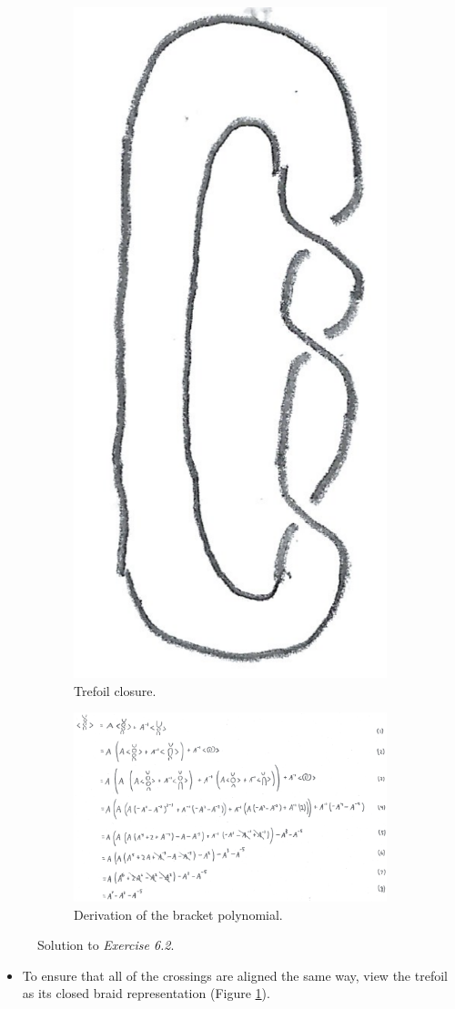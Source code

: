 \documentclass[titlepage]{article}
\numberwithin{figure}{section}
\numberwithin{table}{section}
\numberwithin{equation}{section}
\begin{document}
\begin{itemize}
    \begin{figure}[h!]
        \centering
        \begin{subfigure}[b]{0.3\linewidth}
            \centering
            \includegraphics[width=0.3\linewidth]{Blender/ex6-2a.png}
            \caption{Trefoil closure.}
            \label{fig:ex6-2a}
        \end{subfigure}
        \begin{subfigure}[b]{\linewidth}
            \centering
            \includegraphics[width=\linewidth]{Blender/ex6-2b.png}
            \caption{Derivation of the bracket polynomial.}
            \label{fig:ex6-2b}
        \end{subfigure}
        \caption{Solution to \emph{Exercise 6.2}.}
        \label{fig:ex6-2}
    \end{figure}
    \begin{itemize}
        \item To ensure that all of the crossings are aligned the same way, view the trefoil as its closed braid representation (Figure \ref{fig:ex6-2a}).

\end{itemize}
\end{itemize}
\end{document}
